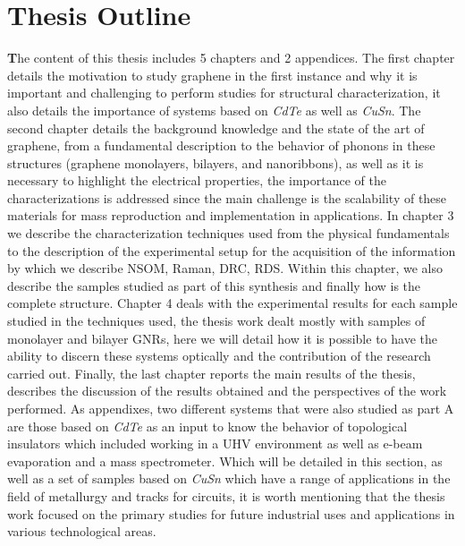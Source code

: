 \section{Thesis Outline}
\vspace{-1cm}
\lettrine[lines=3, lraise=0.1, nindent=0mm, slope=0mm]{\textbf{T}}{}he content of this thesis includes 5 chapters and 2 appendices. The first chapter details the motivation to study graphene in the first instance and why it is important and challenging to perform studies for structural characterization, it also details the importance of systems based on \textit{CdTe} as well as \textit{CuSn}. The second chapter details the background knowledge and the state of the art of graphene, from a fundamental description to the behavior of phonons in these structures (graphene monolayers, bilayers, and nanoribbons), as well as it is necessary to highlight the electrical properties, the importance of the characterizations is addressed since the main challenge is the scalability of these materials for mass reproduction and implementation in applications.  In chapter 3 we describe the characterization techniques used from the physical fundamentals to the description of the experimental setup for the acquisition of the information by which we describe NSOM, Raman, DRC, RDS. Within this chapter, we also describe the samples studied as part of this synthesis and finally how is the complete structure. Chapter 4 deals with the experimental results for each sample studied in the techniques used, the thesis work dealt mostly with samples of monolayer and bilayer GNRs, here we will detail how it is possible to have the ability to discern these systems optically and the contribution of the research carried out. Finally, the last chapter reports the main results of the thesis,  describes the discussion of the results obtained and the perspectives of the work performed. As appendixes, two different systems that were also studied as part A are those based on \textit{CdTe }as an input to know the behavior of topological insulators which included working in a UHV environment as well as e-beam evaporation and a mass spectrometer. Which will be detailed in this section, as well as a set of samples based on \textit{CuSn} which have a range of applications in the field of metallurgy and tracks for circuits, it is worth mentioning that the thesis work focused on the primary studies for future industrial uses and applications in various technological areas. 
